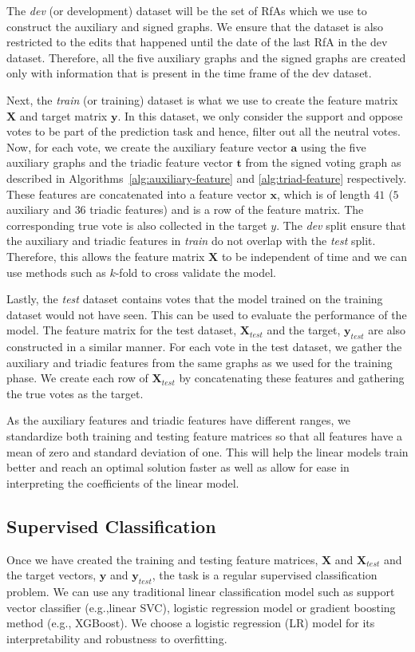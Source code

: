 The \textit{dev} (or development) dataset will be the set of RfAs which we use to construct the auxiliary and signed graphs.
We ensure that the \usercontrib dataset is also restricted to the edits that happened until the date of the last RfA in the dev dataset.
Therefore, all the five auxiliary graphs and the signed graphs are created only with information that is present in the time frame of the dev dataset.

Next, the \textit{train} (or training) dataset is what we use to create the feature matrix $\mathbf{X}$ and target matrix $\mathbf{y}$.
In this dataset, we only consider the support and oppose votes to be part of the prediction task and hence, filter out all the neutral votes.
Now, for each vote, we create the auxiliary feature vector $\textbf{a}$ using the five auxiliary graphs and the triadic feature vector $\mathbf{t}$ from the signed voting graph as described in Algorithms~\ref{alg:auxiliary-feature} and \ref{alg:triad-feature} respectively.
These features are concatenated into a feature vector $\textbf{x}$, which is of length $41$ ($5$ auxiliary and $36$ triadic features) and is a row of the feature matrix.
The corresponding true vote is also collected in the target $y$.
The \textit{dev} split ensure that the auxiliary and triadic features in \textit{train} do not overlap with the \textit{test} split.
Therefore, this allows the feature matrix $\textbf{X}$ to be independent of time and we can use methods such as $k$-fold to cross validate the model.

Lastly, the \textit{test} dataset contains votes that the model trained on the training dataset would not have seen.
This can be used to evaluate the performance of the model.
The feature matrix for the test dataset, $\mathbf{X}_{test}$ and the target, $\mathbf{y}_{test}$ are also constructed in a similar manner.
For each vote in the test dataset, we gather the auxiliary and triadic features from the same graphs as we used for the training phase.
We create each row of $\mathbf{X}_{test}$ by concatenating these features and gathering the true votes as the target.

As the auxiliary features and triadic features have different ranges, we standardize both training and testing feature matrices so that all features have a mean of zero and standard deviation of one.
This will help the linear models train better and reach an optimal solution faster as well as allow for ease in interpreting the coefficients of the linear model.

\subsection{Supervised Classification}
Once we have created the training and testing feature matrices, $\mathbf{X}$ and $\mathbf{X}_{test}$ and the target vectors, $\mathbf{y}$ and $\mathbf{y}_{test}$, the task is a regular supervised classification problem.
We can use any traditional linear classification model such as support vector classifier (e.g.,linear SVC), logistic regression model or gradient boosting method (e.g., XGBoost).
We choose a logistic regression (LR) model for its interpretability and robustness to overfitting. 


